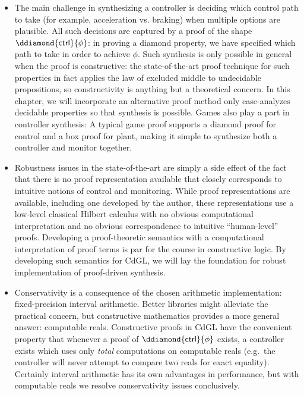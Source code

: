 \documentclass[12pt]{cmuthesis}
\theoremstyle{definition}
\theoremstyle{remark}
\newcommand{\ctrl}{\textsf{ctrl}\xspace}
\newcommand{\CdGL}{\textsf{CdGL}\xspace}
\begin{document}
\begin{itemize}
\item
The main challenge in synthesizing a controller is deciding which control path to take (for example, acceleration vs. braking) when multiple options are plausible.
All such decisions are captured by a proof of the shape $\ddiamond{\ctrl}{\phi}$: in proving a diamond property, we have specified which path to take in order to achieve $\phi$.
Such synthesis is only possible in general when the proof is constructive: the state-of-the-art proof technique for such properties in fact applies the law of excluded middle to undecidable propositions, so constructivity is anything but a theoretical concern.
In this chapter, we will incorporate an alternative proof method only case-analyzes decidable properties so that synthesis is possible.
Games also play a part in controller synthesis: A typical game proof supports a diamond proof for control and a box proof for plant, making it simple to synthesize both a controller and monitor together.
\item
Robustness issues in the state-of-the-art are simply a side effect of the fact that there is no proof representation available that closely corresponds to intuitive notions of control and monitoring.
While proof representations are available, including one developed by the author, these representations use a low-level classical Hilbert calculus with no obvious computational interpretation and no obvious correspondence to intuitive ``human-level'' proofs.
Developing a proof-theoretic semantics with a computational interpretation of proof terms is par for the course in constructive logic.
By developing such semantics for \CdGL, we will lay the foundation for robust implementation of proof-driven synthesis.
\item
Conservativity is a consequence of the chosen arithmetic implementation: fixed-precision interval arithmetic.
Better libraries might alleviate the practical concern, but constructive mathematics provides a more general answer: computable reals.
Constructive proofs in \CdGL have the convenient property that whenever a proof of $\ddiamond{\ctrl}{\phi}$ exists, a controller exists which uses only \emph{total} computations on computable reals (e.g.\ the controller will never attempt to compare two reals for exact equality).
Certainly interval arithmetic has its own advantages in performance, but with computable reals we resolve conservativity issues conclusively.
\end{itemize}
\end{document}
